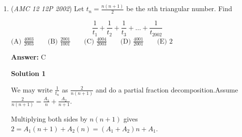 \begin{enumerate}
 \textbf{Answer: }E



\textbf{Solution 1}

Divide by 2 on both sides to get 
 \[3f_{4}(x)-2f_{6}(x)=f_{2}(x)\]Substituting the definitions of $f_{2}(x)$, $f_{4}(x)$, and $f_{6}(x)$, we may rewrite the expression as
 \[3(\text{sin}^4{x} + \text{cos}^4{x}) - 2(\text{sin}^6{x} + \text{cos}^6{x}) = 1\]We now simplify each term separately using some algebraic manipulation and the Pythagorean identity.

 We can rewrite $3(\text{sin}^4 x + \text{cos}^4 x)$ as$3(\text{sin}^2 x + \text{cos}^2 x)^2 - 6\text{sin}^2 x \text{cos}^2 x$, which is equivalent to $3 - 6\text{sin}^2 x \text{cos}^2 x$.

 As for $2(\text{sin}^6 x + \text{cos}^6 x)$, we may factor it as $2(\text{sin}^2 x + \text{cos}^2 x)(\text{sin}^4 x + \text{cos}^4 x - \text{sin}^2 x \text{cos}^2 x)$ which can be rewritten as$2(\text{sin}^4 x + \text{cos}^4 x - \text{sin}^2 x \text{cos}^2 x)$, and then as$2(\text{sin}^2 x + \text{cos}^2 x)^2 - 6\text{sin}^2 x \text{cos}^2 x$, which is equivalent to $2 - 6\text{sin}^2 x \text{cos}^2 x$.

 Putting everything together, we have $(3 - 6\text{sin}^2 {x} \text{cos}^2 {x}) - (2 - 6\text{sin}^2 {x} \text{cos}^2 {x}) = 1$ or $1 = 1$. Therefore, the given equation $3f_{4}(x)-2f_{6}(x)=f_{2}(x)$ is true for all real $x$, meaning that there are certainly more than $8$ values of $x$ in the interval $[0,\pi]$ that satisfy the given equation, and so the answer is $\boxed{\text{(E) more than }8}$.

 


	\item (\textit{AMC 12 12P 2002}) Let $t_n = \frac{n(n+1)}{2}$ be the $n$th triangular number. Find


 
 \[\frac{1}{t_1} + \frac{1}{t_2} + \frac{1}{t_3} + ... + \frac{1}{t_{2002}}\]
$\text{(A) }\frac {4003}{2003} \qquad \text{(B) }\frac {2001}{1001} \qquad \text{(C) }\frac {4004}{2003} \qquad \text{(D) }\frac {4001}{2001} \qquad \text{(E) }2$

 \textbf{Answer: }C



\textbf{Solution 1}

We may write $\frac{1}{t_n}$ as $\frac{2}{n(n+1)}$ and do a partial fraction decomposition.Assume $\frac{2}{n(n+1)} = \frac{A_1}{n} + \frac{A_2}{n+1}$. 

 Multiplying both sides by $n(n+1)$ gives $2 = A_1(n+1) + A_2(n) = (A_1 + A_2)n + A_1$.


\end{enumerate}
